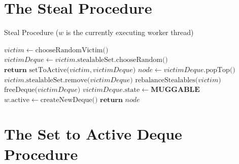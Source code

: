 \documentclass[bsc,frontabs,singlespacing,parskip,deptreport,normalheadings]{infthesis}
\begin{document}
 

\appendix

\chapter{The Steal Procedure}

\begin{algorithm}
\caption{Steal Procedure ($w$ is the currently executing worker thread)}\label{alg:steal}
\begin{algorithmic}[1]
            \State $victim \gets \text{chooseRandomVictim()} $
                \label{line:choose_random_victim}
            \State $ victimDeque \gets victim \text{.stealableSet.chooseRandom()} $
                \label{line:choose_random}
                \State $ \textbf{return } \text{setToActive(} victim, victimDeque \text{)}$ 
            \EndIf
            \State $ node \gets victimDeque \text{.popTop()} $
                \State $ victim \text{.stealableSet.remove(} victimDeque \text{)} $
                \State $ \text{rebalanceStealables(} victim \text{)} $
                    \label{line:rebalance_1}
                    \State $ \text{freeDeque(} victimDeque \text{)} $
                \EndIf
                \State $victimDeque\text{.state} \gets \textbf{MUGGABLE}$
            \EndIf
                    \State $w \text{.active} \gets \text{createNewDeque()}$
                \EndIf
                \State $ \textbf{return } node $
            \EndIf
        \EndWhile
    \EndFunction
\end{algorithmic}
\end{algorithm}

\chapter{The Set to Active Deque Procedure}
\end{document}
